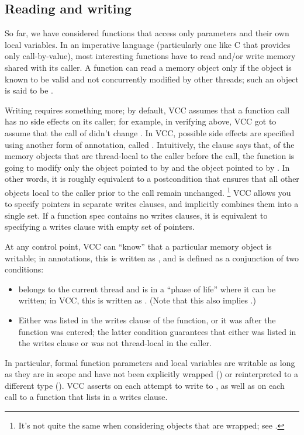 \subsection{Reading and writing}
\label{sect:writes}

So far, we have considered functions that access only parameters and
their own local variables. In an imperative language (particularly one
like C that provides only call-by-value), most interesting functions
have to read and/or write memory shared with its caller. A function
can read a memory object only if the object is known to be valid and
not concurrently modified by other threads; such an object is said to
be . 

Writing requires something more; by default, VCC assumes that a
function call has no side effects on its caller; for example, in
verifying  above, VCC got to assume that the call of
 didn't change . 
In VCC, possible side effects are specified using 
another form of annotation, called .
Intuitively, the clause  says that, 
of the memory objects that are thread-local to the caller before the call,
the function is going to modify only the object pointed to by 
and the object pointed to by .
In other words, it is roughly equivalent to a postcondition that ensures
that all other objects local to the caller prior
to the call remain unchanged.%
\footnote{It's not quite the same when considering objects that are
  wrapped; see .}  VCC allows you
to specify pointers in separate writes clauses, and implicitly
combines them into a single set. If a function spec contains no writes clauses, 
it is equivalent to specifying a writes clause with empty set of
pointers.

At any control point, VCC can ``know'' that a particular memory object
 is writable; in annotations, this is written as
, and is defined as a conjunction of two conditions:
\begin{itemize}
\item {} belongs to the current thread and is in a ``phase of
  life'' where it can be written; in VCC, this is written as 
  . (Note that this also implies .)
\item Either  was listed in the writes clause of the function,
  or it was \vcc{\unwrapped} after the function was entered; the 
  latter condition guarantees that either  was listed in the
  writes clause or was not thread-local in the caller.
\end{itemize}
In particular, formal function parameters and local variables are
writable as long as they are in scope and have not been explicitly
wrapped () or reinterpreted to a
different type ().  VCC asserts
 on each attempt to write to , as well as on
each call to a function that lists  in a writes clause.

